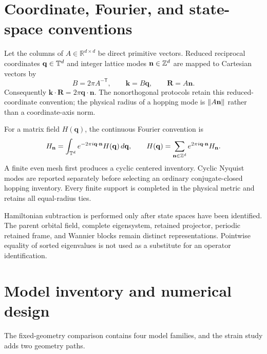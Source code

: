 



\section{Coordinate, Fourier, and state-space conventions}
\label{app:conventions}

Let the columns of $A\in\mathbb R^{d\times d}$ be direct primitive vectors. Reduced
reciprocal coordinates $\mathbf q\in\mathbb T^d$ and integer lattice modes
$\mathbf n\in\mathbb Z^d$ are mapped to Cartesian vectors by
\begin{equation}
 B=2\pi A^{-\mathsf T},\qquad
 \mathbf k=B\mathbf q,\qquad
 \mathbf R=A\mathbf n.
 \label{eq:app-direct-reciprocal-map}
\end{equation}
Consequently $\mathbf k\cdot\mathbf R=2\pi\mathbf q\cdot\mathbf n$. The
nonorthogonal protocols retain this reduced-coordinate convention; the physical radius
of a hopping mode is $\left\lVert A\mathbf n\right\rVert$ rather than a coordinate-axis norm.

For a matrix field $H(\mathbf q)$, the continuous Fourier convention is
\begin{equation}
 H_{\mathbf n}=\int_{\mathbb T^d}
 e^{-2\pi i\mathbf q\cdot\mathbf n}H(\mathbf q)\,d\mathbf q,
 \qquad
 H(\mathbf q)=\sum_{\mathbf n\in\mathbb Z^d}
 e^{2\pi i\mathbf q\cdot\mathbf n}H_{\mathbf n}.
 \label{eq:app-fourier-convention}
\end{equation}
A finite even mesh first produces a cyclic centered inventory. Cyclic Nyquist modes are
reported separately before selecting an ordinary conjugate-closed hopping inventory.
Every finite support is completed in the physical metric and retains all equal-radius
ties.

Hamiltonian subtraction is performed only after state spaces have been identified. The
parent orbital field, complete eigensystem, retained projector, periodic retained frame,
and Wannier blocks remain distinct representations. Pointwise equality of sorted
eigenvalues is not used as a substitute for an operator identification.

\section{Model inventory and numerical design}
\label{app:protocols}

The fixed-geometry comparison contains four model families, and the strain study adds
two geometry paths.

